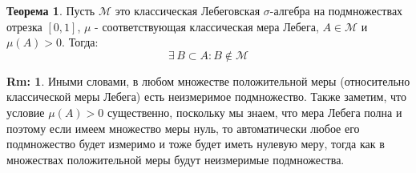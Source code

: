 \documentclass[12pt]{article}
\newcommand{\MM}{\mathcal{M}}
\theoremstyle{definition}
\newtheorem{rem}{Rm:}
\newtheorem{theorem}{Теорема}
\begin{document}
\begin{theorem}
	Пусть $\MM$ это классическая Лебеговская $\sigma$-алгебра на подмножествах отрезка $[0,1]$, $\mu$ - соответствующая классическая мера Лебега, $A \in \MM$ и $\mu(A) > 0$. Тогда:
	$$
		\exists \, B \subset A \colon B \not\in \MM
	$$
\end{theorem}
\begin{rem}
	Иными словами, в любом множестве положительной меры (относительно классической меры Лебега) есть неизмеримое подмножество. Также заметим, что условие $\mu(A) > 0$ существенно, поскольку мы знаем, что мера Лебега полна и поэтому если имеем множество меры нуль, то автоматически любое его подмножество будет измеримо и тоже будет иметь нулевую меру, тогда как в множествах положительной меры будут неизмеримые подмножества.
\end{rem}
\end{document}
